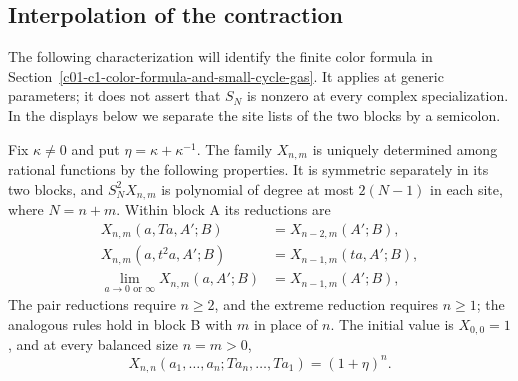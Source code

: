 \subsection{Interpolation of the contraction}

The following characterization will identify the finite color formula
in Section~\ref{c01-c1-color-formula-and-small-cycle-gas}. It applies
at generic parameters; it does not assert that \(S_N\) is nonzero
at every complex specialization. In the displays below we separate
the site lists of the two blocks by a semicolon.

\begin{proposition}\label{prop:pv:pairing-interpolation}
Fix \(\kappa\ne0\) and put \(\eta=\kappa+\kappa^{-1}\).
The family \(X_{n,m}\) is uniquely determined among rational functions
by the following properties. It is symmetric separately in its two
blocks, and \(S_N^2X_{n,m}\) is polynomial of degree at most
\(2(N-1)\) in each site, where \(N=n+m\). Within block A its
reductions are
\[
\begin{aligned}
 X_{n,m}(a,Ta,A';B)&=X_{n-2,m}(A';B),\\
 X_{n,m}(a,t^2a,A';B)&=X_{n-1,m}(ta,A';B),\\
 \lim_{a\to0\text{ or }\infty}X_{n,m}(a,A';B)
 &=X_{n-1,m}(A';B),
\end{aligned}
\]
The pair reductions require \(n\ge2\), and the extreme reduction
requires \(n\ge1\); the analogous rules hold in block B with \(m\)
in place of \(n\). The initial value is
\(X_{0,0}=1\), and at every balanced size \(n=m>0\),
\[
 X_{n,n}(a_1,\ldots,a_n;Ta_n,\ldots,Ta_1)=(1+\eta)^n.
\]
\end{proposition}

